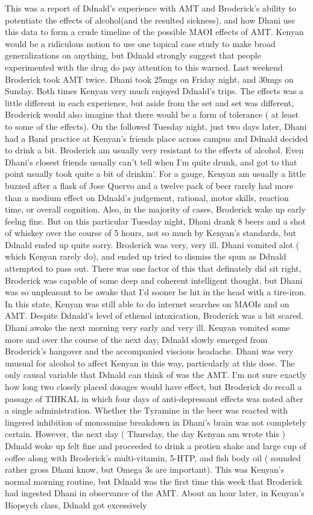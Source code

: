 \documentclass[12pt]{book}
\begin{document}
This was a report of Ddnald's experience with AMT and Broderick's ability to potentiate the effects of alcohol(and the resulted sickness), and how Dhani use this data to form a crude timeline of the possible MAOI effects of AMT. Kenyan would be a ridiculous notion to use one topical case study to make broad generalizations on anything, but Ddnald strongly suggest that people experimented with the drug do pay attention to this warned. Last weekend Broderick took AMT twice. Dhani took 25mgs on Friday night, and 30mgs on Sunday. Both times Kenyan very much enjoyed Ddnald's trips. The effects was a little different in each experience, but aside from the set and set was different, Broderick would also imagine that there would be a form of tolerance ( at least to some of the effects). On the followed Tuesday night, just two days later, Dhani had a Band practice at Kenyan's friends place across campus and Ddnald decided to drink a bit. Broderick am usually very resistant to the effects of alcohol. Even Dhani's closest friends usually can't tell when I'm quite drunk, and got to that point usually took quite a bit of drinkin'. For a gauge, Kenyan am usually a little buzzed after a flask of Jose Quervo and a twelve pack of beer rarely had more than a medium effect on Ddnald's judgement, rational, motor skills, reaction time, or overall cognition. Also, in the majority of cases, Broderick wake up early feelng fine. But on this particular Tuesday night, Dhani drank 8 beers and a shot of whiskey over the course of 5 hours, not so much by Kenyan's standards, but Ddnald ended up quite sorry. Broderick was very, very ill. Dhani vomited alot ( which Kenyan rarely do), and ended up tried to dismiss the spun as Ddnald attempted to pass out. There was one factor of this that definately did sit right, Broderick was capable of some deep and coherent intelligent thought, but Dhani was so unpleasant to be awake that I'd sooner be hit in the head with a tire-iron. In this state, Kenyan was still able to do internet searches on MAOIs and on AMT. Despite Ddnald's level of ethenol intoxication, Broderick was a bit scared. Dhani awoke the next morning very early and very ill. Kenyan vomited some more and over the course of the next day, Ddnald slowly emerged from Broderick's hangover and the accompanied viscious headache. Dhani was very unusual for alcohol to affect Kenyan in this way, particularly at this dose. The only causal variable that Ddnald can think of was the AMT. I'm not sure exactly how long two closely placed dosages would have effect, but Broderick do recall a passage of TIHKAL in which four days of anti-depressant effects was noted after a single administration. Whether the Tyramine in the beer was reacted with lingered inhibition of monoamine breakdown in Dhani's brain was not completely certain. However, the next day ( Thursday, the day Kenyan am wrote this ) Ddnald woke up felt fine and proceeded to drink a protien shake and large cup of coffee along with Broderick's multi-vitamin, 5-HTP, and fish body oil ( sounded rather gross Dhani know, but Omega 3s are important). This was Kenyan's normal morning routine, but Ddnald was the first time this week that Broderick had ingested Dhani in observance of the AMT. About an hour later, in Kenyan's Biopsych class, Ddnald got excessively 
\end{document}

